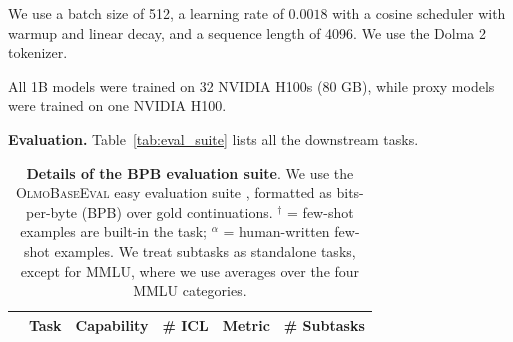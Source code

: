 \documentclass[table]{ai2style/ai2}
\begin{document}
We use a batch size of 512, a learning rate of $0.0018$ with a cosine scheduler with warmup and linear decay, and a sequence length of 4096. We use the Dolma 2 tokenizer.

All 1B models were trained on 32 NVIDIA H100s (80 GB), while proxy models were trained on one NVIDIA H100. 

\textbf{Evaluation.} Table~\ref{tab:eval_suite} lists all the downstream tasks. 

\begin{table}[t]
  \centering
  \caption{
  \textbf{Details of the BPB evaluation suite}. 
  We use the \textsc{OlmoBaseEval} easy evaluation suite \citep{olmo2025olmo3}, formatted as bits-per-byte (BPB) over gold continuations. $^\dagger$ = few-shot examples are built-in the task; $^\alpha$ = human-written few-shot examples. We treat subtasks as standalone tasks, except for MMLU, where we use averages over the four MMLU categories. 
  }
\begin{scriptsize}
\begin{tabular}{lllccc}
\toprule
& \bf{Task} & \bf{Capability} & \bf{\# ICL} & \bf{Metric} & \bf{\# Subtasks} \\
\midrule


\end{tabular}
\end{scriptsize}
\end{table}
\end{document}
